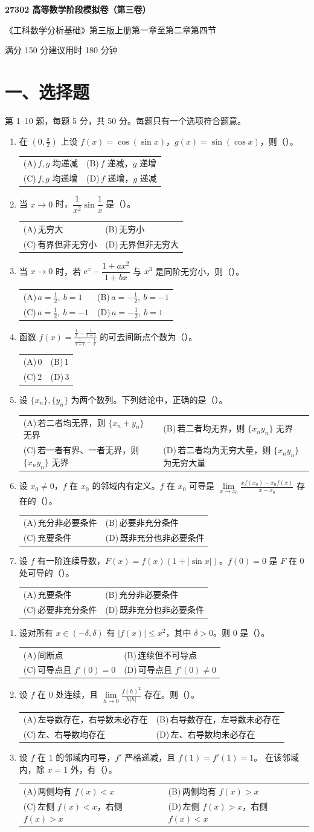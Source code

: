 \documentclass[UTF8,a4paper,zihao=-4,fontset=fandol]{ctexart}
\makeatletter
\renewcommand{\lim}{\operatorname*{lim}\limits}
\newcommand{\choices}[4]{%
  \par\noindent\begin{tabularx}{\linewidth}{@{}X@{\hspace{1em}}X@{}}
    (A)\,#1 & (B)\,#2 \\
    (C)\,#3 & (D)\,#4
  \end{tabularx}\par}
\newcommand{\paper}[1]{%
  \pdfbookmark[0]{第#1卷}{paper.\thepage}%
  \begin{center}
    {\LARGE\bfseries 27302 高等数学阶段模拟卷（第#1卷）\par}
    \small 《工科数学分析基础》第三版上册第一章至第二章第四节\par
    满分 150 分\qquad 建议用时 180 分钟
  \end{center}
  \section*{一、选择题}
  第 1--10 题，每题 5 分，共 50 分。每题只有一个选项符合题意。}
\makeatother
\begin{document}
\newpage
\paper{三}
\begin{enumerate}
\item 在 $(0,\frac{\pi}{2})$ 上设 $f(x)=\cos(\sin x)$，$g(x)=\sin(\cos x)$，则（\quad）。
\choices{$f,g$ 均递减}{$f$ 递减，$g$ 递增}{$f,g$ 均递增}{$f$ 递增，$g$ 递减}
\item 当 $x\to0$ 时，$\dfrac{1}{x^2}\sin\dfrac1x$ 是（\quad）。
\choices{无穷大}{无穷小}{有界但非无穷小}{无界但非无穷大}
\item 当 $x\to0$ 时，若 $\mathrm{e}^x-\dfrac{1+ax^2}{1+bx}$ 与 $x^3$ 是同阶无穷小，则（\quad）。
\choices{$a=\tfrac12,\ b=1$}{$a=-\tfrac12,\ b=-1$}{$a=\tfrac12,\ b=-1$}{$a=-\tfrac12,\ b=1$}
\item 函数 $\displaystyle f(x)=\frac{\frac{1}{x}-\frac{1}{x+1}}{\frac{1}{x-1}-\frac{1}{x}}$ 的可去间断点个数为（\quad）。
\choices{0}{1}{2}{3}
\item 设 $\{x_n\},\{y_n\}$ 为两个数列。下列结论中，正确的是（\quad）。
\choices{若二者均无界，则 $\{x_n+y_n\}$ 无界}
{若二者均无界，则 $\{x_ny_n\}$ 无界}
{若一者有界、一者无界，则 $\{x_ny_n\}$ 无界}
{若二者均为无穷大量，则 $\{x_ny_n\}$ 为无穷大量}
\item 设 $x_0\ne0$，$f$ 在 $x_0$ 的邻域内有定义。$f$ 在 $x_0$ 可导是
$\displaystyle\lim_{x\to x_0}\frac{xf(x_0)-x_0f(x)}{x-x_0}$ 存在的（\quad）。
\choices{充分非必要条件}{必要非充分条件}{充要条件}{既非充分也非必要条件}
\item 设 $f$ 有一阶连续导数，$F(x)=f(x)(1+|\sin x|)$。$f(0)=0$ 是 $F$ 在 $0$ 处可导的（\quad）。
\choices{充要条件}{充分非必要条件}{必要非充分条件}{既非充分也非必要条件}
\end{enumerate}
\newpage
\begin{enumerate}[start=8]
\item 设对所有 $x\in(-\delta,\delta)$ 有 $|f(x)|\le x^2$，其中 $\delta>0$。则 $0$ 是（\quad）。
\choices{间断点}{连续但不可导点}{可导点且 $f'(0)=0$}{可导点且 $f'(0)\ne0$}
\item 设 $f$ 在 $0$ 处连续，且 $\displaystyle\lim_{h\to0}\frac{f(h)^2}{h|h|}$ 存在。则（\quad）。
\choices{左导数存在，右导数未必存在}{右导数存在，左导数未必存在}
{左、右导数均存在}{左、右导数均未必存在}
\item 设 $f$ 在 $1$ 的邻域内可导，$f'$ 严格递减，且 $f(1)=f'(1)=1$。
在该邻域内，除 $x=1$ 外，有（\quad）。
\choices{两侧均有 $f(x)<x$}{两侧均有 $f(x)>x$}
{左侧 $f(x)<x$，右侧 $f(x)>x$}{左侧 $f(x)>x$，右侧 $f(x)<x$}
\end{enumerate}
\end{document}
